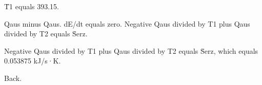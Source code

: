 T̄1 equals 393.15.  

Qaus minus Qaus.  
dE/dt equals zero.  
Negative Qaus divided by T1 plus Qaus divided by T2 equals Ṡerz.  

Negative Qaus divided by T1 plus Qaus divided by T2 equals Ṡerz, which equals 0.053875 kJ/s·K.  

Back.
